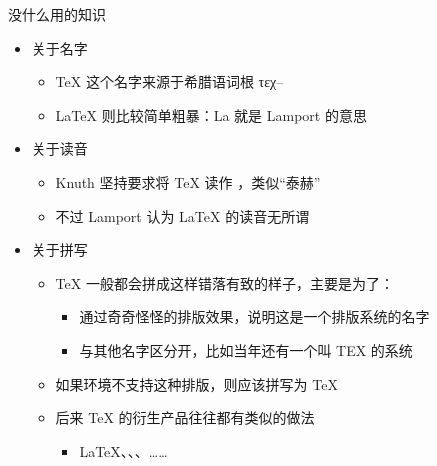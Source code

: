 \begin{frame}[fragile]{没什么用的知识}
  \begin{itemize}
    \item 关于名字
          \begin{itemize}
            \item \TeX{} 这个名字来源于希腊语词根 τεχ--
            \item \LaTeX{} 则比较简单粗暴：La 就是 Lamport 的意思
          \end{itemize}
    \item 关于读音
          \begin{itemize}
            \item Knuth 坚持要求将 \TeX{} 读作 ，类似“泰赫”
            \item 不过 Lamport 认为 \LaTeX{} 的读音无所谓
          \end{itemize}
    \item 关于拼写
          \begin{itemize}
            \item \TeX{} 一般都会拼成这样错落有致的样子，主要是为了：
                  \begin{itemize}
                    \item 通过奇奇怪怪的排版效果，说明这是一个排版系统的名字
                    \item 与其他名字区分开，比如当年还有一个叫 TEX 的系统
                  \end{itemize}
            \item 如果环境不支持这种排版，则应该拼写为 TeX
            \item 后来 \TeX{} 的衍生产品往往都有类似的做法
                  \begin{itemize}
                    \item \LaTeX{}、\BibTeX{}、\XeTeX{}、\CTeX{}……
                  \end{itemize}
          \end{itemize}
  \end{itemize}
\end{frame}

